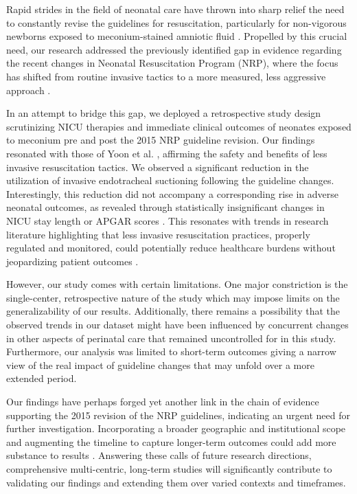 \documentclass[11pt]{article}
\begin{document}
Rapid strides in the field of neonatal care have thrown into sharp relief the need to constantly revise the guidelines for resuscitation, particularly for non-vigorous newborns exposed to meconium-stained amniotic fluid \cite{Kapoor2020NeonatalR}. Propelled by this crucial need, our research addressed the previously identified gap in evidence regarding the recent changes in Neonatal Resuscitation Program (NRP), where the focus has shifted from routine invasive tactics to a more measured, less aggressive approach \cite{Lee2016MeconiumAS}.

In an attempt to bridge this gap, we deployed a retrospective study design scrutinizing NICU therapies and immediate clinical outcomes of neonates exposed to meconium pre and post the 2015 NRP guideline revision. Our findings resonated with those of Yoon et al. \cite{Yoon2021ImpactON}, affirming the safety and benefits of less invasive resuscitation tactics. We observed a significant reduction in the utilization of invasive endotracheal suctioning following the guideline changes. Interestingly, this reduction did not accompany a corresponding rise in adverse neonatal outcomes, as revealed through statistically insignificant changes in NICU stay length or APGAR scores \cite{Shukla2019AssociationOA, Howard2021AssociationOV}. This resonates with trends in research literature highlighting that less invasive resuscitation practices, properly regulated and monitored, could potentially reduce healthcare burdens without jeopardizing patient outcomes \cite{Huang2017ImpactOC}.

However, our study comes with certain limitations. One major constriction is the single-center, retrospective nature of the study which may impose limits on the generalizability of our results. Additionally, there remains a possibility that the observed trends in our dataset might have been influenced by concurrent changes in other aspects of perinatal care that remained uncontrolled for in this study. Furthermore, our analysis was limited to short-term outcomes giving a narrow view of the real impact of guideline changes that may unfold over a more extended period.

Our findings have perhaps forged yet another link in the chain of evidence supporting the 2015 revision of the NRP guidelines, indicating an urgent need for further investigation. Incorporating a broader geographic and institutional scope and augmenting the timeline to capture longer-term outcomes could add more substance to results \cite{Tran2021EarlyEN, Silversides2019FluidMA}. Answering these calls of future research directions, comprehensive multi-centric, long-term studies will significantly contribute to validating our findings and extending them over varied contexts and timeframes.
\end{document}
